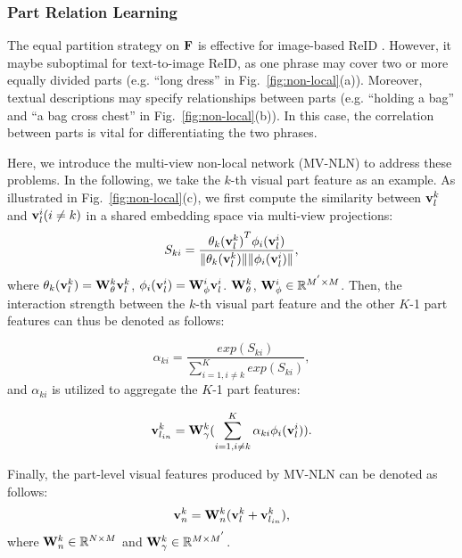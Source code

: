 \documentclass[journal]{IEEEtran}
\begin{document}
\subsubsection{Part Relation Learning}
The equal partition strategy on $\bf{F}$ is effective for image-based ReID \cite{sun2018beyond,yao2019deep}. However, it maybe suboptimal for text-to-image ReID, as one phrase may cover two or more equally divided parts (e.g. ``long dress'' in Fig.~\ref{fig:non-local}(a)). Moreover, textual descriptions may specify relationships between parts (e.g. ``holding a bag'' and ``a bag cross chest'' in Fig.~\ref{fig:non-local}(b)). In this case, the correlation between parts is vital for differentiating the two phrases.

Here, we introduce the multi-view non-local network (MV-NLN) to address these problems. In the following, we take the $k$-th visual part feature as an example. As illustrated in Fig.~\ref{fig:non-local}(c), we first compute the similarity between ${\bf{v}}_l^k$ and ${\bf{v}}_l^i(i\neq k)$ in a shared embedding space via multi-view projections:
\begin{equation}
S_{ki}=\frac{{{\theta}_k({\bf{v}}_l^k)}^T {\phi}_i({\bf{v}}_l^i)}{\|{\theta}_k({\bf{v}}_l^k)\| \|{\phi}_i({\bf{v}}_l^i)\|},
\end{equation}
where ${\theta}_k({\bf{v}}_l^k) = {\bf{W}}_{\theta}^{k} {\bf{v}}_l^k$, ${\phi}_i({\bf{v}}_l^i) = {\bf{W}}_{\phi}^{i} {\bf{v}}_l^i$. ${\bf{W}}_{\theta}^{k}$, ${{\bf{W}}_{\phi}^{i}} \in \mathbb{R}^{M^{'} \times M}$. Then, the interaction strength between the $k$-th visual part feature and the other $K$-1 part features can thus be denoted as follows:

\begin{equation}
\alpha_{ki} = \frac{exp({S}_{ki})}{\sum_{i=1,i\neq k}^{K} exp({S}_{ki})},
\end{equation}
and $\alpha_{ki}$ is utilized to aggregate the $K$-1 part features:

\begin{equation}
{\bf{v}}_{l_{in}}^{k} = {\bf{W}}_{\gamma}^{k}(\sum_{i=1,i\neq k}^{K} {\alpha_{ki}{\phi}_i({\bf{v}}_l^i)}).
\end{equation}

Finally, the part-level visual features produced by MV-NLN can be denoted as follows:
\begin{equation}
{\bf{v}}_n^k = {\bf{W}}_{n}^k ({\bf{v}}_l^k + {\bf{v}}_{l_{in}}^{k}),
\end{equation}
where ${\bf{W}}_{n}^k \in \mathbb{R}^{N \times M}$ and ${\bf{W}}_{\gamma}^{k} \in \mathbb{R}^{M \times M^{'}}$.
\end{document}
